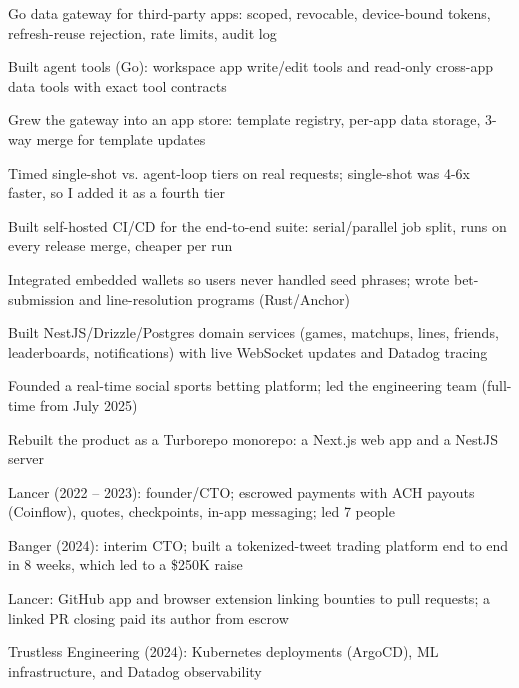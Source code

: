 \documentclass[print]{jack-resume}
\begin{document}
\begin{tightemize}
    \item Go data gateway for third-party apps: scoped, revocable, device-bound tokens, refresh-reuse rejection, rate limits, audit log
    \item Built agent tools (Go): workspace app write/edit tools and read-only cross-app data tools with exact tool contracts
    \item Grew the gateway into an app store: template registry, per-app data storage, 3-way merge for template updates
    \item Timed single-shot vs. agent-loop tiers on real requests; single-shot was 4-6x faster, so I added it as a fourth tier
    \item Built self-hosted CI/CD for the end-to-end suite: serial/parallel job split, runs on every release merge, cheaper per run
\end{tightemize}
\sectionsep

\begin{tightemize}
    \item Integrated embedded wallets so users never handled seed phrases; wrote bet-submission and line-resolution programs (Rust/Anchor)
    \item Built NestJS/Drizzle/Postgres domain services (games, matchups, lines, friends, leaderboards, notifications) with live WebSocket updates and Datadog tracing
    \item Founded a real-time social sports betting platform; led the engineering team (full-time from July 2025)
    \item Rebuilt the product as a Turborepo monorepo: a Next.js web app and a NestJS server
\end{tightemize}
\sectionsep

\begin{tightemize}
    \item Lancer (2022 -- 2023): founder/CTO; escrowed payments with ACH payouts (Coinflow), quotes, checkpoints, in-app messaging; led 7 people
    \item Banger (2024): interim CTO; built a tokenized-tweet trading platform end to end in 8 weeks, which led to a \$250K raise
    \item Lancer: GitHub app and browser extension linking bounties to pull requests; a linked PR closing paid its author from escrow
    \item Trustless Engineering (2024): Kubernetes deployments (ArgoCD), ML infrastructure, and Datadog observability
\end{tightemize}
\sectionsep
\end{document}
